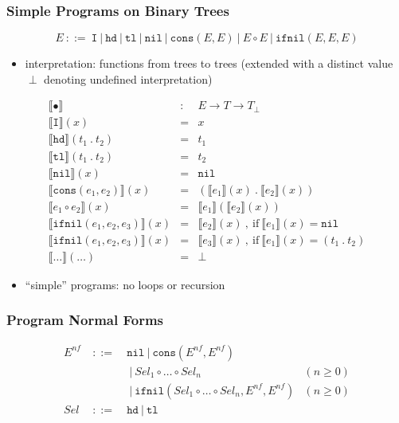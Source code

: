 \documentclass{beamer}
\begin{document}
\begin{frame}
  \frametitle{Simple Programs on Binary Trees}
  \[ E ~::=~ \texttt{I} ~|~ \texttt{hd} ~|~ \texttt{tl} ~|~ \texttt{nil}
       ~|~ \texttt{cons}(E, E)
       ~|~ E \circ E
       ~|~ \texttt{ifnil}(E, E, E)  \]
  \begin{itemize}
    \item interpretation: functions from trees to trees 
      (extended with a distinct value $\perp$ denoting undefined interpretation)
  \end{itemize}
  \[
    \begin{array}{lcl}
    \llbracket \bullet \rrbracket & : & E \rightarrow T \rightarrow T_{\perp} \\
    \llbracket \texttt{I} \rrbracket(x) & = & x \\
    \llbracket \texttt{hd} \rrbracket(t_1 ~.~ t_2) & = & t_1 \\
    \llbracket \texttt{tl} \rrbracket(t_1 ~.~ t_2) & = & t_2 \\
    \llbracket \texttt{nil} \rrbracket(x) & = & \texttt{nil} \\
    \llbracket \texttt{cons}(e_1, e_2) \rrbracket(x) & = & 
        (\llbracket e_1 \rrbracket(x) ~.~ \llbracket e_2 \rrbracket(x)) \\
    \llbracket e_1 \circ e_2 \rrbracket(x) & = & 
        \llbracket e_1 \rrbracket(\llbracket e_2 \rrbracket(x)) \\
    \llbracket \texttt{ifnil}(e_1, e_2, e_3) \rrbracket(x) & = & 
        \llbracket e_2 \rrbracket(x) ~,~ \text{if} ~ \llbracket e_1 \rrbracket(x) = \texttt{nil} \\
    \llbracket \texttt{ifnil}(e_1, e_2, e_3) \rrbracket(x) & = & 
        \llbracket e_3 \rrbracket(x) ~,~ \text{if} ~ \llbracket e_1 \rrbracket(x) = (t_1 ~.~ t_2) \\
    \llbracket \ldots \rrbracket(\ldots) & = & \perp
    \end{array}  
  \]
  \begin{itemize}
    \item ``simple'' programs: no loops or recursion
  \end{itemize}
\end{frame}

\begin{frame}
  \frametitle{Program Normal Forms}
  \[\begin{array}{lclr}
  E^{nf} & ~::=~ & \texttt{nil} ~|~ \texttt{cons}(E^{nf}, E^{nf}) & \\
         &       & ~|~ \mathit{Sel}_1 \circ \ldots \circ \mathit{Sel}_n & (n \ge 0) \\
         &       & ~|~ \texttt{ifnil}(\mathit{Sel}_1 \circ \ldots \circ \mathit{Sel}_n, E^{nf}, E^{nf}) & (n \ge 0) \\
  \mathit{Sel} & ~::=~ & \texttt{hd} ~|~ \texttt{tl} & 
  \end{array}
  \]
  
\end{frame}
\end{document}
